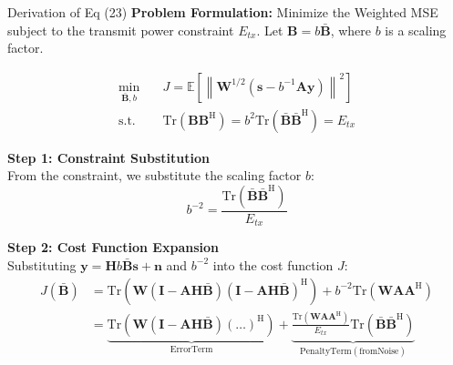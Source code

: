 \documentclass[aspectratio=169, 10pt]{beamer}
\begin{document}
\begin{frame}[label=app-update_B]{Derivation of Eq (23)}
    \footnotesize %
    \textbf{Problem Formulation:}
    Minimize the Weighted MSE subject to the transmit power constraint $E_{tx}$.
    Let $\mathbf{B} = b \bar{\mathbf{B}}$, where $b$ is a scaling factor.

    \begin{align*}
        \min_{\bar{\mathbf{B}}, b} \quad & J = \mathbb{E} \left[ \left\| \mathbf{W}^{1/2} (\mathbf{s} - b^{-1} \mathbf{A} \mathbf{y}) \right\|^2 \right]        \\
        \mathrm{s.t.} \quad              & \mathrm{Tr}(\mathbf{B}\mathbf{B}^\mathrm{H}) = b^2 \mathrm{Tr}(\bar{\mathbf{B}}\bar{\mathbf{B}}^\mathrm{H}) = E_{tx}
    \end{align*}

    \textbf{Step 1: Constraint Substitution} \\
    From the constraint, we substitute the scaling factor $b$:
    \begin{equation*}
        b^{-2} = \frac{\mathrm{Tr}(\bar{\mathbf{B}}\bar{\mathbf{B}}^\mathrm{H})}{E_{tx}}
    \end{equation*}

    \textbf{Step 2: Cost Function Expansion} \\
    Substituting $\mathbf{y} = \mathbf{H} b \bar{\mathbf{B}} \mathbf{s} + \mathbf{n}$ and $b^{-2}$ into the cost function $J$:
    \begin{align*}
        J(\bar{\mathbf{B}}) & = \mathrm{Tr} \left( \mathbf{W} (\mathbf{I} - \mathbf{A}\mathbf{H}\bar{\mathbf{B}})(\mathbf{I} - \mathbf{A}\mathbf{H}\bar{\mathbf{B}})^\mathrm{H} \right) + b^{-2} \mathrm{Tr}(\mathbf{W}\mathbf{A}\mathbf{A}^\mathrm{H})                                                                                                           \\
                            & = \underbrace{\mathrm{Tr} \left( \mathbf{W} (\mathbf{I} - \mathbf{A}\mathbf{H}\bar{\mathbf{B}})(\dots)^\mathrm{H} \right)}_{\mathrm{Error Term}} + \underbrace{\frac{\mathrm{Tr}(\mathbf{W}\mathbf{A}\mathbf{A}^\mathrm{H})}{E_{tx}} \mathrm{Tr}(\bar{\mathbf{B}}\bar{\mathbf{B}}^\mathrm{H})}_{\mathrm{Penalty Term (from Noise)}}
    \end{align*}
\end{frame}
\end{document}
